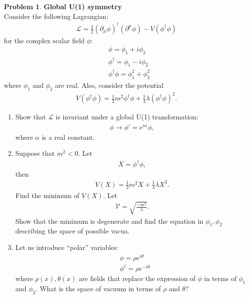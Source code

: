 \documentclass{book}
\numberwithin{equation}{section}
\theoremstyle{definition}
\newtheorem{prob}{Problem}[section]
\newcommand{\p}{\partial}
\newcommand{\lag}{\mathcal{L}}
\begin{document}
\begin{prob}\textbf{Global U(1) symmetry}\\
	
	Consider the following Lagrangian:
	\begin{align}
	\lag = \frac{1}{2}(\p_\mu\phi)^\dagger(\p^\mu \phi) - V(\phi^\dagger\phi)
	\end{align}
	for the complex scalar field $\phi$:
	\begin{align}
	&\phi = \phi_1 + i\phi_2\\
	&\phi^\dagger = \phi_1 - i\phi_2\\
	&\phi^\dagger\phi = \phi_1^2 + \phi_2^2
	\end{align}
	where $\phi_1$ and $\phi_2$ are real. Also, consider the potential
	\begin{align}
	V(\phi^\dagger\phi) = \frac{1}{2}m^2\phi^\dagger\phi + \frac{1}{4}\lambda(\phi^\dagger\phi)^2.
	\end{align}
	
	\begin{enumerate}
	\item Show that $\lag$ is invariant under a global U(1) transformation:
	\begin{align}
	\phi \to \phi' = e^{i\alpha}\phi,
	\end{align}
	where $\alpha$ is a real constant. \\
	
	\item Suppose that $m^2 < 0$. Let 
	\begin{align}
	X = \phi^\dagger\phi,
	\end{align}
	then
	\begin{align}
	V(X) = \frac{1}{2}m^2X + \frac{1}{4}\lambda X^2.
	\end{align} 
	Find the minimum of $V(X)$. Let 
	\begin{align}
	\mathcal{V} = \sqrt{\frac{-m^2}{\lambda}}. 
	\end{align}
	Show that the minimum is degenerate and find the equation in $\phi_1, \phi_2$ describing the space of possible vacua.\\
	
	\item Let us introduce ``polar'' variables:
	\begin{align}
	&\phi = \rho e^{i\theta}\\
	&\phi^\dagger = \rho e^{-i\theta}
	\end{align}
	where $\rho(x), \theta(x)$ are fields that replace the expression of $\phi$ in terms of $\phi_1$ and $\phi_2$. What is the space of vacuum in terms of $\rho$ and $\theta$?\\
		

\end{enumerate}
\end{prob}
\end{document}
